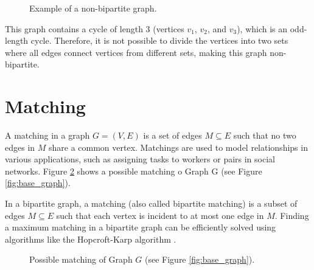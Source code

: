         \begin{figure}[!ht]
            \centering
            \caption{Example of a non-bipartite graph.} 
            \label{fig:non_bipartite_graph}
        \end{figure}
        
        This graph contains a cycle of length 3 (vertices \(v_1\), \(v_2\), and \(v_3\)), which is an odd-length cycle. Therefore, it is not possible to divide the vertices into two sets where all edges connect vertices from different sets, making this graph non-bipartite.
        


        \section{Matching}

            A matching in a graph \( G = (V, E) \) is a set of edges \( M \subseteq E \) such that no two edges in \( M \) share a common vertex\cite{cormen, bondy1976graph}. Matchings are used to model relationships in various applications, such as assigning tasks to workers or pairs in social networks. Figure \ref{fig:possible_matching} shows a possible matching o Graph G (see Figure \ref{fig:base_graph}).
            
            In a bipartite graph, a matching (also called bipartite matching) is a subset of edges \( M \subseteq E \) such that each vertex is incident to at most one edge in \( M \). Finding a maximum matching in a bipartite graph can be efficiently solved using algorithms like the Hopcroft-Karp algorithm \cite{west2001introduction, diestel2017graph}.


            \begin{figure}[!ht]
                \centering
                \caption{Possible matching of Graph $G$ (see Figure \ref{fig:base_graph}).}
                \label{fig:possible_matching}
            \end{figure}
            
